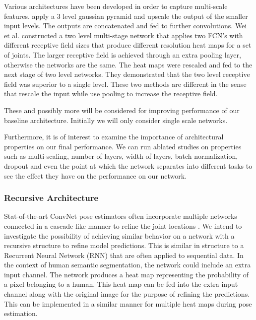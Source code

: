 \documentclass[a4paper,10pt]{article}
\begin{document}
Various architectures have been developed in order to capture multi-scale features.  \cite{Tompson2015} apply a 3 level gaussian pyramid and upscale the output of the smaller input levels.  The outputs are concatenated and fed to further convolutions.  Wei et al. \cite{Wei2016} constructed a two level multi-stage network that applies two FCN's with different receptive field sizes that produce different resolution heat maps for a set of joints.  The larger receptive field is achieved through an extra pooling layer, otherwise the networks are the same. The heat maps were rescaled and fed to the next stage of two level networks.   They demonstrated that the two level receptive field was superior to a single level.  These two methods are different in the sense that \cite{Tompson2015} rescale the input while \cite{Wei2016} use pooling to increase the receptive field.



These and possibly more will be considered for improving performance of our baseline architecture.  Initially we will only consider single scale networks.

Furthermore, it is of interest to examine the importance of architectural properties on our final performance.  We can run ablated studies on properties such as multi-scaling, number of layers, width of layers, batch normalization, dropout and even the point at which the network separates into different tasks to see the effect they have on the performance on our network.

\subsubsection{Recursive Architecture}
\label{sec:arc:recursive}
Stat-of-the-art ConvNet pose estimators often incorporate multiple networks connected in a cascade like manner to refine the joint locations \cite{Tompson2015,Wei2016}.  We intend to investigate the possibility of achieving similar behavior on a network with a recursive structure to refine model predictions.  This is similar in structure to a Recurrent Neural Network (RNN) \cite{Sak2014} that are often applied to sequential data.  In the context of human semantic segmentation, the network could include an extra input channel.  The network produces a heat map representing the probability of a pixel belonging to a human.  This heat map can be fed into the extra input channel along with the original image for the purpose of refining the predictions.  This can be implemented in a similar manner for multiple heat maps during pose estimation.  
\end{document}
